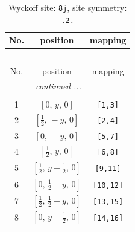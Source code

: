 \documentclass[fleqn,8pt]{jsarticle}
\begin{document}
\begin{longtable}{ccc}
\caption{Wyckoff site: {\tt 8j}, site symmetry: {\tt .2.}}
 \\
 \hline \hline
No. & position & mapping \\ \hline \endfirsthead

\multicolumn{2}{l}{\tablename\ \thetable{}} \\
 \hline \hline
No. & position & mapping \\ \hline \endhead

 \hline \hline
\multicolumn{2}{r}{\footnotesize\it continued ...} \\ \endfoot

 \hline \hline
\multicolumn{2}{r}{} \\ \endlastfoot

1 & $\left[ 0,\, y,\, 0 \right]$ & {\tt [1,3]} \\ \hline
2 & $\left[ \frac{1}{2},\, - y,\, 0 \right]$ & {\tt [2,4]} \\ \hline
3 & $\left[ 0,\, - y,\, 0 \right]$ & {\tt [5,7]} \\ \hline
4 & $\left[ \frac{1}{2},\, y,\, 0 \right]$ & {\tt [6,8]} \\ \hline
5 & $\left[ \frac{1}{2},\, y + \frac{1}{2},\, 0 \right]$ & {\tt [9,11]} \\ \hline
6 & $\left[ 0,\, \frac{1}{2} - y,\, 0 \right]$ & {\tt [10,12]} \\ \hline
7 & $\left[ \frac{1}{2},\, \frac{1}{2} - y,\, 0 \right]$ & {\tt [13,15]} \\ \hline
8 & $\left[ 0,\, y + \frac{1}{2},\, 0 \right]$ & {\tt [14,16]} \\
\end{longtable}
\renewcommand{\arraystretch}{1.2}
\end{document}
